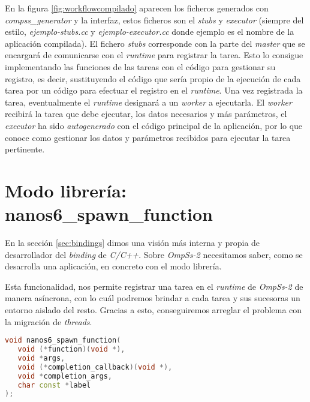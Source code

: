 \par\bigskip
En la figura \ref{fig:workflowcompilado} aparecen los ficheros generados con \textit{compss\_generator} y la interfaz, estos ficheros son el \textit{stubs} y \textit{executor} (siempre del estilo, \textit{ejemplo-stubs.cc} y \textit{ejemplo-executor.cc} donde ejemplo es el nombre de la aplicación compilada). El fichero \textit{stubs} corresponde con la parte del \textit{master} que se encargará de comunicarse con el \textit{runtime} para registrar la tarea. Esto lo consigue implementando las funciones de las tareas con el código para gestionar su registro, es decir, sustituyendo el código que sería propio de la ejecución de cada tarea por un código para efectuar el registro en el \textit{runtime}. Una vez registrada la tarea, eventualmente el \textit{runtime} designará a un \textit{worker} a ejecutarla. El \textit{worker} recibirá la tarea que debe ejecutar, los datos necesarios y más parámetros, el \textit{executor} ha sido \textit{autogenerado} con el código principal de la aplicación, por lo que conoce como gestionar los datos y parámetros recibidos para ejecutar la tarea pertinente. 

\section{Modo librería: nanos6\_spawn\_function \label{spawnfunction}}

En la sección \ref{sec:bindings} dimos una visión más interna y propia de desarrollador del \textit{binding} de \textit{C/C++}. Sobre \textit{OmpSs-2} necesitamos saber, como se desarrolla una aplicación, en concreto con el modo librería.
\medskip

Esta funcionalidad, nos permite registrar una tarea en el \textit{runtime} de \textit{OmpSs-2} de manera asíncrona, con lo cuál podremos brindar a cada tarea y sus sucesoras un entorno aislado del resto. Gracias a esto, conseguiremos arreglar el problema con la migración de \textit{threads}. \smallskip

\begin{minipage}{\linewidth}
\begin{lstlisting}[caption={Definición de la función nanos6\_spawn\_function.},captionpos=b, label={lst:nanos6spawn}, language=C++]
void nanos6_spawn_function(
   void (*function)(void *), 
   void *args,
   void (*completion_callback)(void *), 
   void *completion_args, 
   char const *label
);
\end{lstlisting}
\end{minipage}

